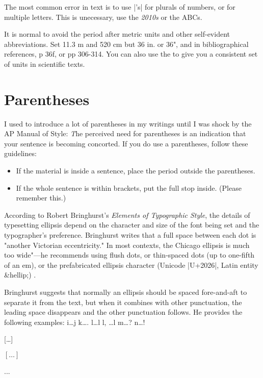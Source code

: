 The most common error in text is to use |'s| for plurals of numbers, or for multiple letters. This is unecessary, use the \emph{2010s} or the ABCs.

It is normal to avoid the period after metric units and other self-evident abbreviations. Set 11.3 m and 520 cm but 36 in. or 36", and in bibliographical references, p 36f, or pp 306-314. You can also use the  to give you a consistent set of units in scientific texts.

\section{Parentheses}

I used to introduce a lot of parentheses in my writings until I was shock by the AP Manual of Style:
{\emph The perceived need for parentheses is an indication that your sentence is becoming concorted}. If you do use a parentheses, follow these guidelines:

\begin{itemize}
\item If the material is inside a sentence, place the period outside the parentheses.
\item If the whole sentence is within brackets, put the full stop inside. (Please remember this.)
\end{itemize}

According to Robert Bringhurst's  \textit{Elements of Typographic Style}, the details of typesetting ellipsis depend on the character and size of the font being set and the typographer's preference. Bringhurst writes that a full space between each dot is "another Victorian eccentricity." In most contexts, the Chicago ellipsis is much too wide"—he recommends using flush dots, or thin-spaced dots (up to one-fifth of an em), or the prefabricated ellipsis character (Unicode |U+2026|, Latin entity \&hellip;) \citep{Bringhurst2005}.

Bringhurst suggests that normally an ellipsis should be spaced fore-and-aft to separate it from the text, but when it combines with other punctuation, the leading space disappears and the other punctuation follows. He provides the following examples:
i\ldots j	k\ldots.	l\ldots l	l, \ldots l	m\ldots?	n\ldots!

[\dots]\lorem

$[\ldots]$\lorem

...\lorem

